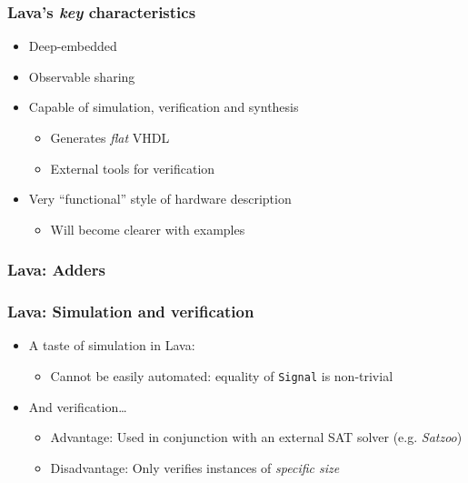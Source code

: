 \documentclass{beamer}
\begin{document}
            \begin{frame}
                \frametitle{Lava's \emph{key} characteristics}

                \begin{itemize}
                    \item Deep-embedded
                    \item Observable sharing
                    \item Capable of simulation, verification and synthesis
                        \begin{itemize}
                            \item Generates \emph{flat} VHDL
                            \item External tools for verification
                        \end{itemize}
                    \item Very ``functional'' style of hardware description
                        \begin{itemize}
                            \item Will become clearer with examples
                        \end{itemize}
                \end{itemize}
            \end{frame}

            \begin{frame}
                \frametitle{Lava: Adders}
            \end{frame}

            \begin{frame}
                \frametitle{Lava: Simulation and verification}

                \begin{itemize}
                    \item A taste of simulation in Lava:
                        \begin{itemize}
                            \item Cannot be easily automated: equality of \texttt{Signal} is non-trivial
                        \end{itemize}

                    \item And verification\ldots
                        \begin{itemize}
                            \item Advantage: Used in conjunction with an external SAT solver (e.g. \emph{Satzoo})
                            \item Disadvantage: Only verifies instances of \emph{specific size}
                        \end{itemize}
                \end{itemize}
            \end{frame}
\end{document}
